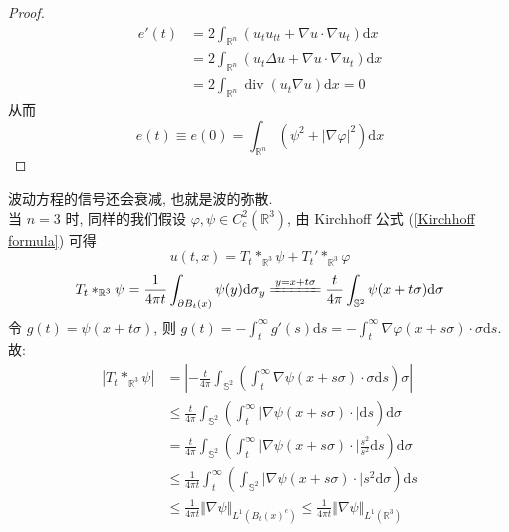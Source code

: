 \documentclass[11pt]{ctexart}[UTF8]
\begin{document}
\begin{proof}
    \begin{equation*}
        \begin{aligned}
            e'(t) &= 2\int_{\mathbb{R}^{n}} \left( u_{t}u_{tt} + \nabla u \cdot \nabla u_{t} \right) \mathrm{d}x\\
                  &= 2\int_{\mathbb{R}^{n}} \left( u_{t}\Delta u + \nabla u \cdot \nabla u_{t} \right) \mathrm{d}x\\
                  &= 2\int_{\mathbb{R}^{n}} \operatorname{div}(u_{t} \nabla u) \mathrm{d}x = 0
        \end{aligned}
    \end{equation*}
    从而
    \begin{equation*}
        e(t) \equiv e(0) = \int_{\mathbb{R}^{n}} \left( \psi^2 + |\nabla \varphi|^2 \right) \mathrm{d}x
    \end{equation*}
\end{proof}
波动方程的信号还会衰减, 也就是波的弥散.\\
当 $n=3$ 时, 同样的我们假设 $\varphi,\psi \in C_{c}^{2}(\mathbb{R}^{3})$, 由 Kirchhoff 公式 (\ref{Kirchhoff formula}) 可得
\begin{equation*}
    u(t,x) = T_{t} \ast_{\mathbb{R}^{3}} \psi + T_{t}' \ast_{\mathbb{R}^{3}} \varphi 
\end{equation*}
\begin{equation*}
    T_{t} \ast_{\mathbb{R}^{3}} \psi = \frac{1}{4\pi t}\int_{\partial B_{t}(x)}  \psi(y) \mathrm{d}\sigma_{y} \xlongequal{y=x+t\sigma} \frac{t}{4\pi} \int_{\mathbb{S}^{2}}  \psi(x+t\sigma) \mathrm{d}\sigma
\end{equation*}
令 $g(t) = \psi(x+t\sigma)$, 则 $g(t) = -\int_{t}^{\infty} g'(s)\mathrm{d}s = -\int_{t}^{\infty} \nabla \varphi(x+s\sigma) \cdot \sigma \mathrm{d}s$. 故:
\begin{equation*}
    \begin{aligned}
        |T_{t} \ast_{\mathbb{R}^{3}} \psi| &= \left|-\frac{t}{4\pi}\int_{\mathbb{S}^{2}}\left(\int_{t}^{\infty} \nabla\psi(x+s\sigma)\cdot \sigma \mathrm{d}s\right)\sigma\right| \\
        &\leq \frac{t}{4\pi} \int_{\mathbb{S}^{2}} \left(\int_{t}^{\infty}\left| \nabla\psi(x+s\sigma)\cdot\right| \mathrm{d}s \right)\mathrm{d}\sigma \\
        &= \frac{t}{4\pi} \int_{\mathbb{S}^{2}} \left(\int_{t}^{\infty}\left| \nabla\psi(x+s\sigma)\cdot\right|\frac{s^2}{s^2} \mathrm{d}s \right)\mathrm{d}\sigma \\
        &\leq \frac{1}{4\pi t}  \int_{t}^{\infty}\left(\int_{\mathbb{S}^{2}}\left| \nabla\psi(x+s\sigma)\cdot\right|s^2 \mathrm{d}\sigma \right)\mathrm{d}s \\
        &\leq \frac{1}{4\pi t}\Vert \nabla\psi \Vert_{L^{1}(B_t(x)^{c})} \leq \frac{1}{4\pi t}\Vert \nabla\psi \Vert_{L^{1}(\mathbb{R}^{3})}
    \end{aligned}
\end{equation*}
\end{document}
